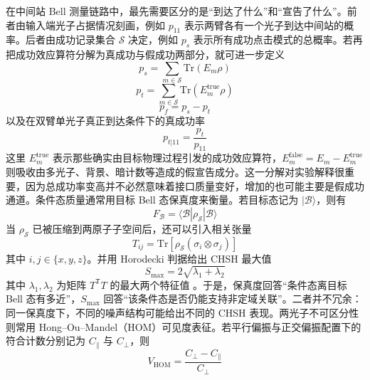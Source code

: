 在中间站 Bell 测量链路中，最先需要区分的是“到达了什么”和“宣告了什么”。前者由输入端光子占据情况刻画，例如 $p_{11}$ 表示两臂各有一个光子到达中间站的概率。后者由成功记录集合 $\mathcal S$ 决定，例如 $p_s$ 表示所有成功点击模式的总概率。若再把成功效应算符分解为真成功与假成功两部分，就可进一步定义
\begin{equation}
p_s = \sum_{m\in\mathcal S}\mathrm{Tr}(E_m\rho)
\label{eq:ch2-success-total}
\end{equation}
\begin{equation}
p_t = \sum_{m\in\mathcal S}\mathrm{Tr}(E_m^{\mathrm{true}}\rho)
\label{eq:ch2-success-true}
\end{equation}
\begin{equation}
p_f = p_s-p_t
\label{eq:ch2-success-false}
\end{equation}
以及在双臂单光子真正到达条件下的真成功率
\begin{equation}
p_{t|11}=\frac{p_t}{p_{11}}
\label{eq:ch2-conditional-true}
\end{equation}
这里 $E_m^{\mathrm{true}}$ 表示那些确实由目标物理过程引发的成功效应算符，$E_m^{\mathrm{false}}=E_m-E_m^{\mathrm{true}}$ 则吸收由多光子、背景、暗计数等造成的假宣告成分。这一分解对实验解释很重要，因为总成功率变高并不必然意味着接口质量变好，增加的也可能主要是假成功通道。条件态质量通常用目标 Bell 态保真度来衡量。若目标态记为 $|\mathcal B\rangle$，则有
\begin{equation}
F_{\mathcal B}=\langle \mathcal B|\rho_{\mathcal S}|\mathcal B\rangle
\label{eq:ch2-bell-fidelity}
\end{equation}
当 $\rho_{\mathcal S}$ 已被压缩到两原子子空间后，还可以引入相关张量
\begin{equation}
T_{ij}=\mathrm{Tr}\left[\rho_{\mathcal S}(\sigma_i\otimes\sigma_j)\right]
\label{eq:ch2-correlation-tensor}
\end{equation}
其中 $i,j\in\{x,y,z\}$。并用 Horodecki 判据给出 CHSH 最大值
\begin{equation}
S_{\max}=2\sqrt{\lambda_1+\lambda_2}
\label{eq:ch2-chsh-max}
\end{equation}
其中 $\lambda_1,\lambda_2$ 为矩阵 $T^{\mathsf T}T$ 的最大两个特征值 \cite{Horodecki1995CHSH}。于是，保真度回答“条件态离目标 Bell 态有多近”，$S_{\max}$ 回答“该条件态是否仍能支持非定域关联”。二者并不冗余：同一保真度下，不同的噪声结构可能给出不同的 CHSH 表现。两光子不可区分性则常用 Hong--Ou--Mandel（HOM）可见度表征。若平行偏振与正交偏振配置下的符合计数分别记为 $C_{\parallel}$ 与 $C_{\perp}$，则
\begin{equation}
V_{\mathrm{HOM}}=\frac{C_{\perp}-C_{\parallel}}{C_{\perp}}
\label{eq:ch2-hom-visibility}
\end{equation}
